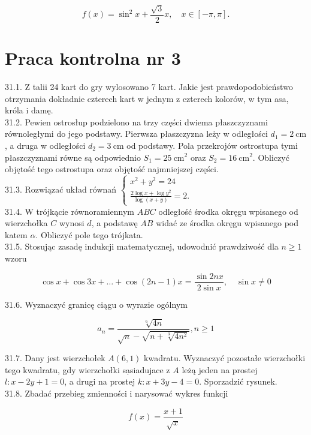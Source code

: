 \documentclass[10pt]{article}
\begin{document}
$$
f(x)=\sin ^{2} x+\frac{\sqrt{3}}{2} x, \quad x \in[-\pi, \pi] .
$$

\section*{Praca kontrolna nr 3}
31.1. Z talii 24 kart do gry wylosowano 7 kart. Jakie jest prawdopodobieństwo otrzymania dokładnie czterech kart w jednym z czterech kolorów, w tym asa, króla i damę.\\
31.2. Pewien ostrosłup podzielono na trzy części dwiema płaszczyznami równoległymi do jego podstawy. Pierwsza płaszczyzna leży w odległości $d_{1}=2 \mathrm{~cm}$, a druga w odległości $d_{2}=3 \mathrm{~cm}$ od podstawy. Pola przekrojów ostrostupa tymi płaszczyznami równe są odpowiednio $S_{1}=25 \mathrm{~cm}^{2}$ oraz $S_{2}=16 \mathrm{~cm}^{2}$. Obliczyć objętość tego ostrostupa oraz objętość najmniejszej części.\\
31.3. Rozwiązać układ równań $\left\{\begin{array}{l}x^{2}+y^{2}=24 \\ \frac{2 \log x+\log y^{2}}{\log (x+y)}=2 .\end{array}\right.$\\
31.4. W trójkącie równoramiennym $A B C$ odległość środka okręgu wpisanego od wierzchołka $C$ wynosi $d$, a podstawę $A B$ widać ze środka okręgu wpisanego pod katem $\alpha$. Obliczyć pole tego trójkata.\\
31.5. Stosując zasadę indukcji matematycznej, udowodnić prawdziwość dla $n \geq 1$ wzoru

$$
\cos x+\cos 3 x+\ldots+\cos (2 n-1) x=\frac{\sin 2 n x}{2 \sin x}, \quad \sin x \neq 0
$$

31.6. Wyznaczyć granicę ciągu o wyrazie ogólnym

$$
a_{n}=\frac{\sqrt[6]{4 n}}{\sqrt{n}-\sqrt{n+\sqrt[3]{4 n^{2}}}}, n \geq 1
$$

31.7. Dany jest wierzchołek $A(6,1)$ kwadratu. Wyznaczyć pozostałe wierzchołki tego kwadratu, gdy wierzchołki sạsiadujace z $A$ leżą jeden na prostej $l: x-2 y+1=0$, a drugi na prostej $k: x+3 y-4=0$. Sporzadzić rysunek.\\
31.8. Zbadać przebieg zmienności i narysować wykres funkcji

$$
f(x)=\frac{x+1}{\sqrt{x}}
$$
\end{document}
